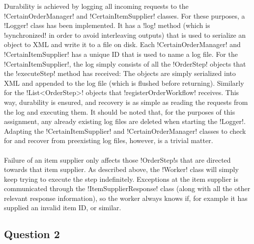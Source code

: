 \documentclass[a4paper, 12pt]{article}
\begin{document}
Durability is achieved by logging all incoming requests to the
!CertainOrderManager! and !CertainItemSupplier! classes. For these
purposes, a !Logger! class has been implemented. It has a !log! method
(which is !synchronized! in order to avoid interleaving outputs) that
is used to serialize an object to XML and write it to a file on
disk. Each !CertainOrderManager! and !CertainItemSupplier! has a
unique ID that is used to name a log file. For the
!CertainItemSupplier!, the log simply consists of all the !OrderStep!
objects that the !executeStep! method has received: The objects are
simply serialized into XML and appended to the log file (which is
flushed before returning). Similarly for the !List<OrderStep>! objects
that !registerOrderWorkflow! receives. This way, durability is
ensured, and recovery is as simple as reading the requests from the
log and executing them. It should be noted that, for the purposes of
this assignment, any already existing log files are deleted when
starting the !Logger!. Adapting the !CertainItemSupplier! and
!CertainOrderManager! classes to check for and recover from
preexisting log files, however, is a trivial matter.

\paragraph{}


Failure of an item supplier only affects those !OrderStep!s that are
directed towards that item supplier. As described above, the !Worker!
class will simply keep trying to execute the step
indefinitely. Exceptions at the item supplier is communicated through
the !ItemSupplierResponse! class (along with all the other relevant
response information), so the worker always knows if, for example it
has supplied an invalid item ID, or similar.

\subsection*{Question 2}


\end{document}
